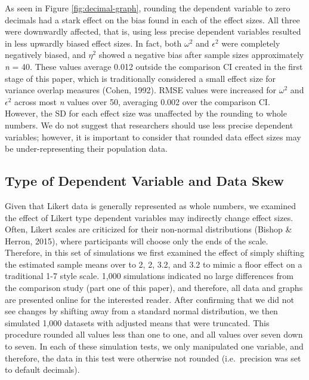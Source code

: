 \documentclass[english,man]{apa6}
\theoremstyle{definition}
\theoremstyle{definition}
\theoremstyle{definition}
\theoremstyle{remark}
\begin{document}
As seen in Figure \ref{fig:decimal-graph}, rounding the dependent
variable to zero decimals had a stark effect on the bias found in each
of the effect sizes. All three were downwardly affected, that is, using
less precise dependent variables resulted in less upwardly biased effect
sizes. In fact, both \(\omega^2\) and \(\epsilon^2\) were completely
negatively biased, and \(\eta^2\) showed a negative bias after sample
sizes approximately \emph{n} = 40. These values average 0.012 outside
the comparison CI created in the first stage of this paper, which is
traditionally considered a small effect size for variance overlap
measures (Cohen, 1992). RMSE values were increased for \(\omega^2\) and
\(\epsilon^2\) across most \emph{n} values over 50, averaging 0.002 over
the comparison CI. However, the SD for each effect size was unaffected
by the rounding to whole numbers. We do not suggest that researchers
should use less precise dependent variables; however, it is important to
consider that rounded data effect sizes may be under-representing their
population data.

\subsection{Type of Dependent Variable and Data
Skew}\label{type-of-dependent-variable-and-data-skew}

Given that Likert data is generally represented as whole numbers, we
examined the effect of Likert type dependent variables may indirectly
change effect sizes. Often, Likert scales are criticized for their
non-normal distributions (Bishop \& Herron, 2015), where participants
will choose only the ends of the scale. Therefore, in this set of
simulations we first examined the effect of simply shifting the
estimated sample means over to 2, 2, 3.2, and 3.2 to mimic a floor
effect on a traditional 1-7 style scale. 1,000 simulations indicated no
large differences from the comparison study (part one of this paper),
and therefore, all data and graphs are presented online for the
interested reader. After confirming that we did not see changes by
shifting away from a standard normal distribution, we then simulated
1,000 datasets with adjusted means that were truncated. This procedure
rounded all values less than one to one, and all values over seven down
to seven. In each of these simulation tests, we only manipulated one
variable, and therefore, the data in this test were otherwise not
rounded (i.e.~precision was set to default decimals).
\end{document}
